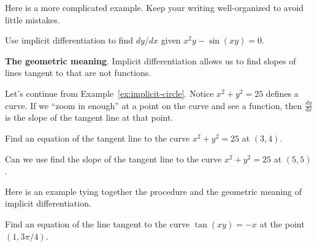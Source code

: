 \documentclass[../main.tex]{subfiles}
\begin{document}
  Here is a more complicated example. Keep your writing well-organized to avoid little mistakes.
  \begin{example}
    Use implicit differentiation to find \(dy/dx\) given \(x^{2}y - \sin(xy) = 0\).

  \end{example}

  \clearpage
  \textbf{The geometric meaning}. Implicit differentiation allows us to find slopes of lines tangent to  that are not functions. 

  Let's continue from Example~\ref{ex:implicit-circle}. Notice \(x^{2} + y^{2} = 25\) defines a curve. If we ``zoom in enough'' at a point on the curve and see a function, then \(\tfrac{dy}{dx}\) is the slope of the tangent line at that point. 


  \begin{example}
    Find an equation of the tangent line to the curve \(x^{2} + y^{2} = 25\) at \((3,4)\).
  \end{example}

  \faComment{} Can we use find the slope of the tangent line to the curve \(x^{2} + y^{2} = 25\) at \((5,5)\).

  \clearpage
  Here is an example tying together the procedure and the geometric meaning of implicit differentiation.
  \begin{example}
    Find an equation of the line tangent to the curve \(\tan(xy) = -x\) at the point \((1,3\pi/4)\).
  \end{example}
\end{document}
